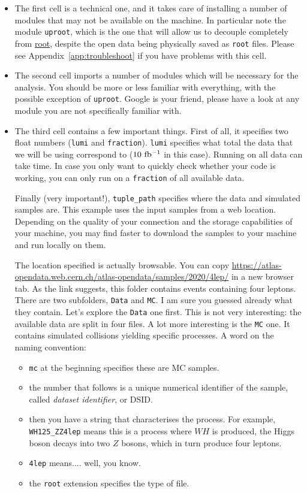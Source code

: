 \begin{itemize}
\item The first cell is a technical one, and it takes care of installing a number of modules that may not be available on the machine. In particular note the module \verb|uproot|, which is the one that will allow us to decouple completely from \href{https://root.cern.ch/}{root}, despite the open data being physically saved as \verb|root| files. Please see Appendix~\ref{app:troubleshoot} if you have problems with this cell. 

\item The second cell imports a number of modules which will be necessary for the analysis. You should be more or less familiar with everything, with the possible exception of \verb|uproot|. Google is your friend, please have a look at any module you are not specifically familiar with. 

\item The third cell contains a few important things. First of all, it specifies two float numbers (\verb|lumi| and \verb|fraction|). \verb|lumi| specifies what total \Lint the data that we will be using correspond to ($10\ \ifb$ in this case). Running on all data can take time. In case you only want to quickly check whether your code is working, you can only run on a \verb|fraction| of all available data. 

Finally (very important!), \verb|tuple_path| specifies where the data and simulated samples are. This example uses the input samples from a web location. Depending on the quality of your connection and the storage capabilities of your machine, you may find faster to download the samples to your machine and run locally on them. 

The location specified is actually browsable. You can copy \url{https://atlas-opendata.web.cern.ch/atlas-opendata/samples/2020/4lep/} in a new browser tab. As the link suggests, this folder contains events containing four leptons. There are two subfolders, \verb|Data| and \verb|MC|. I am sure you guessed already what they contain. Let's explore the \verb|Data| one first. This is not very interesting: the available data are split in four files. A lot more interesting is the \verb|MC| one. It contains simulated collisions yielding specific processes. A word on the naming convention: 

\begin{itemize} 
\item \verb|mc| at the beginning specifies these are MC samples. 
\item the number that follows is a unique numerical identifier of the sample, called \textit{dataset identifier}, or DSID. 
\item then you have a string that characterises the process. For example, \verb|WH125_ZZ4lep| means this is a process where $WH$ is produced, the Higgs boson decays into two $Z$ bosons, which in turn produce four leptons. 
\item \verb|4lep| means.... well, you know. 
\item the \verb|root| extension specifies the type of file. 
\end{itemize}  


\end{itemize}
